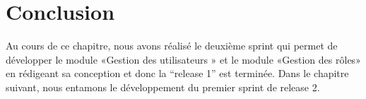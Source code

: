 \section*{Conclusion}
Au cours de ce chapitre, nous avons réalisé le deuxième sprint qui permet de développer le module «Gestion des utilisateurs » et le module «Gestion des rôles» en rédigeant sa conception et donc la “release 1” est terminée. Dans le chapitre suivant, nous entamons le développement du premier sprint de release 2. 
